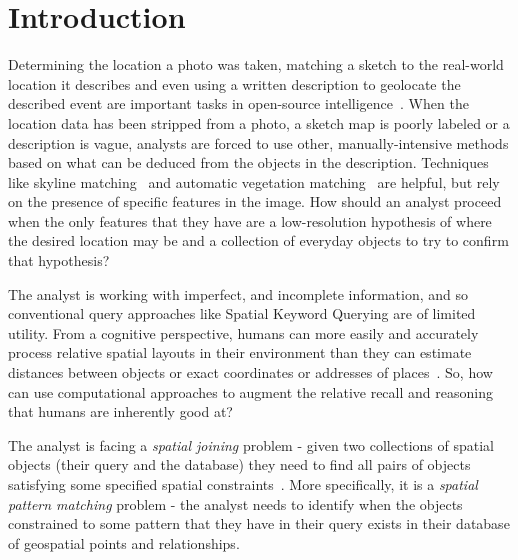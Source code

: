 \section{Introduction}

\label{section:introduction}


\par{
    Determining the location a photo was taken, matching a sketch to the real-world location it describes and even using a written description to geolocate the described event are important tasks in open-source intelligence~\cite{Higgins2021, Williams2023}.
    When the location data has been stripped from a photo, a sketch map is poorly labeled or a description is vague, analysts are forced to use other, manually-intensive methods based on what can be deduced from the objects in the description.
    Techniques like skyline matching~\cite{Stein1995, Baatz2012} and automatic vegetation matching~\cite{Schmidt2022} are helpful, but rely on the presence of specific features in the image.
    How should an analyst proceed when the only features that they have are a low-resolution hypothesis of where the desired location may be and a collection of everyday objects to try to confirm that hypothesis?
}
\par{
    The analyst is working with imperfect, and incomplete information, and so conventional query approaches like Spatial Keyword Querying are of limited utility. 
    From a cognitive perspective, humans can more easily and accurately process relative spatial layouts in their environment than they can estimate distances between objects or exact coordinates or addresses of places~\cite{Schwering2014, Weisberg2016, Miller2013, Keatley2021}.
    So, how can use computational approaches to augment the relative recall and reasoning that humans are inherently good at?
}

\par{
     The analyst is facing a \textit{spatial joining} problem - given two collections of spatial objects (their query and the database) they need to  find all pairs of objects satisfying some specified spatial constraints~\cite{Jacox2007}. 
    More specifically, it is a \textit{spatial pattern matching} problem - the analyst needs to identify when the objects constrained to some pattern that they have in their query exists in their database of geospatial points and relationships.
}


